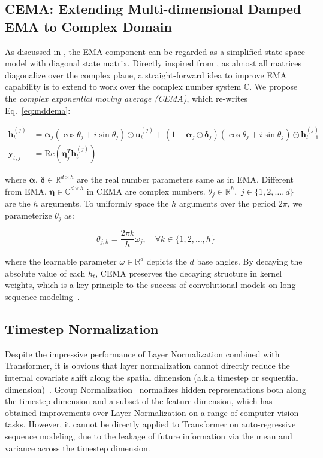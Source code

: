 \subsection{CEMA: Extending Multi-dimensional Damped EMA to Complex Domain}
\label{subsec:cema}
As discussed in \citet{ma2023mega}, the EMA component can be regarded as a simplified state space model with diagonal state matrix. Directly inspired from \citet{gu2022parameterization}, as almost all matrices diagonalize over the complex plane, a straight-forward idea to improve EMA capability is to extend to work over the complex number system $\mathbb{C}$. 
We propose the \emph{complex exponential moving average (CEMA)}, which re-writes Eq.~\eqref{eq:mddema}:

\begin{align}
\label{eq:cema}
\mathbf{h}^{(j)}_t & = \boldsymbol{\alpha}_j (\cos{\theta_j + i \sin{\theta_j}}) \odot \mathbf{u}^{(j)}_t + (1 - \boldsymbol{\alpha}_j \odot \boldsymbol{\delta}_j) (\cos{\theta_j + i \sin{\theta_j}}) \odot \mathbf{h}^{(j)}_{t-1} \nonumber \\
\mathbf{y}_{t,j} & = \mathrm{Re}(\boldsymbol{\eta}^T_j \mathbf{h}^{(j)}_t )
\end{align}

where $\boldsymbol{\alpha}$, $\boldsymbol{\delta} \in \mathbb{R}^{d\times h}$ are the real number parameters same as in EMA. Different from EMA, $\boldsymbol{\eta} \in \mathbb{C}^{d\times h}$ in CEMA are complex numbers. 
$\theta_j \in \mathbb{R}^{h}, \,\, j \in \{1, 2, \ldots, d\}$ are the $h$ arguments. To uniformly space the $h$ arguments over the period $2\pi$, we parameterize $\theta_j$ as:

\begin{equation}
\theta_{j,k} = \frac{2\pi k}{h} \omega_j, \quad \forall k \in \{1, 2, \ldots, h\}
\end{equation}

where the learnable parameter $\omega \in \mathbb{R}^{d}$ depicts the $d$ base angles. By decaying the absolute value of each $h_t$, CEMA preserves the decaying structure in kernel weights, which is a key principle to the success of convolutional models on long sequence modeling~\citep{li2023makes}.

\subsection{Timestep Normalization}
\label{subsec:timestepnorm}

Despite the impressive performance of Layer Normalization combined with Transformer, it is obvious that layer normalization cannot directly reduce the internal covariate shift along the spatial dimension (a.k.a timestep or sequential dimension)~\citep{ioffe2015batch}. Group Normalization~\citep{wu2018group} normalizes hidden representations both along the timestep dimension and a subset of the feature dimension, which has obtained improvements over Layer Normalization on a range of computer vision tasks. However, it cannot be directly applied to Transformer on auto-regressive sequence modeling, due to the leakage of future information via the mean and variance across the timestep dimension. 

